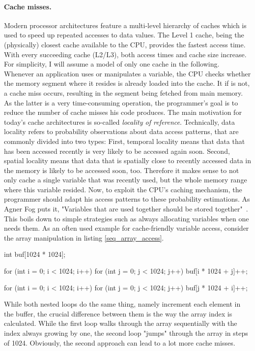 \paragraph{Cache misses.} Modern processor architectures feature a multi-level hierarchy of caches which is used to speed up repeated accesses to data values. The Level 1 cache, being the (physically) closest cache available to the CPU, provides the fastest access time. With every succeeding cache (L2/L3), both access times and cache size increase. For simplicity, I will assume a model of only one cache in the following. Whenever an application uses or manipulates a variable, the CPU checks whether the memory segment where it resides is already loaded into the cache. It if is not, a cache miss occurs, resulting in the segment being fetched from main memory. As the latter is a very time-consuming operation, the programmer's goal is to reduce the number of cache misses his code produces. The main motivation for today's cache architectures is so-called \emph{locality of reference}. Technically, data locality refers to probability observations about data access patterns, that are commonly divided into two types: First, temporal locality means that data that has been accessed recently is very likely to be accessed again soon. Second, spatial locality means that data that is spatially close to recently accessed data in the memory is likely to be accessed soon, too. Therefore it makes sense to not only cache a single variable that was recently used, but the whole memory range where this variable resided. Now, to exploit the CPU's caching mechanism, the programmer should adapt his access patterns to these probability estimations. As Agner Fog puts it, "Variables that are used together should be stored together"~\cite[p. 88]{fog2011optimizing}. This boils down to simple strategies such as always allocating variables when one needs them. As an often used example for cache-friendly variable access, consider the array manipulation in listing \ref{seq_array_access}.
\begin{code}[caption={Sequential vs. non-sequential array access}, label=seq_array_access]
int buf[1024 * 1024];

for (int i = 0; i < 1024; i++)
  for (int j = 0; j < 1024; j++)
    buf[i * 1024 + j]++;

for (int i = 0; i < 1024; i++)
  for (int j = 0; j < 1024; j++)
    buf[j * 1024 + i]++;
\end{code}

While both nested loops do the same thing, namely increment each element in the buffer, the crucial difference between them is the way the array index is calculated. While the first loop walks through the array sequentially with the index always growing by one, the second loop "jumps" through the array in steps of 1024. Obviously, the second approach can lead to a lot more cache misses.

